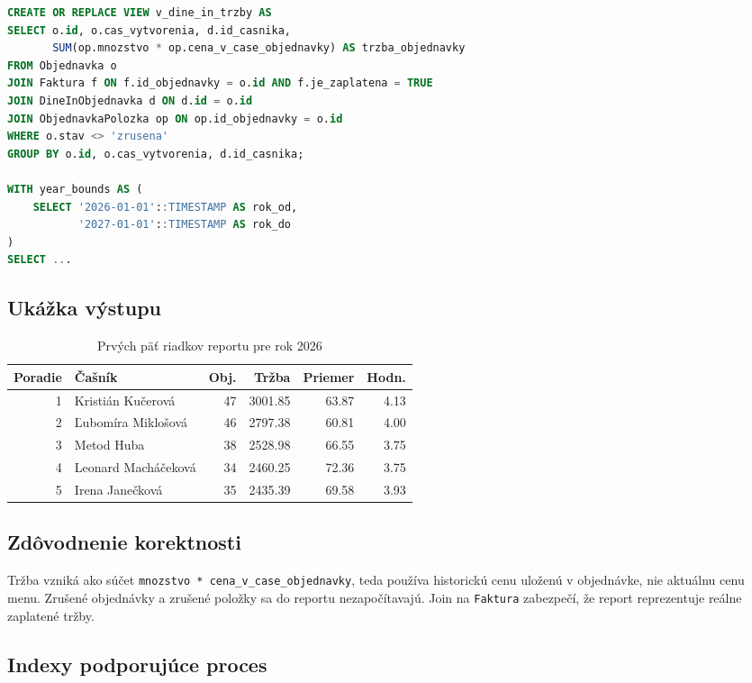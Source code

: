 \documentclass[11pt, a4paper]{article}
\begin{document}
\begin{lstlisting}[language=SQL]
CREATE OR REPLACE VIEW v_dine_in_trzby AS
SELECT o.id, o.cas_vytvorenia, d.id_casnika,
       SUM(op.mnozstvo * op.cena_v_case_objednavky) AS trzba_objednavky
FROM Objednavka o
JOIN Faktura f ON f.id_objednavky = o.id AND f.je_zaplatena = TRUE
JOIN DineInObjednavka d ON d.id = o.id
JOIN ObjednavkaPolozka op ON op.id_objednavky = o.id
WHERE o.stav <> 'zrusena'
GROUP BY o.id, o.cas_vytvorenia, d.id_casnika;

WITH year_bounds AS (
    SELECT '2026-01-01'::TIMESTAMP AS rok_od,
           '2027-01-01'::TIMESTAMP AS rok_do
)
SELECT ...
\end{lstlisting}

\subsection*{Ukážka výstupu}

\begin{table}[H]
\centering
\small
\begin{tabular}{rlrrrr}
\toprule
\textbf{Poradie} & \textbf{Čašník} & \textbf{Obj.} & \textbf{Tržba} & \textbf{Priemer} & \textbf{Hodn.} \\
\midrule
1 & Kristián Kučerová & 47 & 3001.85 & 63.87 & 4.13 \\
2 & Ľubomíra Miklošová & 46 & 2797.38 & 60.81 & 4.00 \\
3 & Metod Huba & 38 & 2528.98 & 66.55 & 3.75 \\
4 & Leonard Macháčeková & 34 & 2460.25 & 72.36 & 3.75 \\
5 & Irena Janečková & 35 & 2435.39 & 69.58 & 3.93 \\
\bottomrule
\end{tabular}
\caption{Prvých päť riadkov reportu pre rok 2026}
\end{table}

\subsection*{Zdôvodnenie korektnosti}

Tržba vzniká ako súčet \texttt{mnozstvo * cena\_v\_case\_objednavky}, teda používa historickú cenu
uloženú v objednávke, nie aktuálnu cenu menu. Zrušené objednávky a zrušené položky sa do reportu
nezapočítavajú. Join na \texttt{Faktura} zabezpečí, že report reprezentuje reálne zaplatené tržby.

\subsection*{Indexy podporujúce proces}
\end{document}
